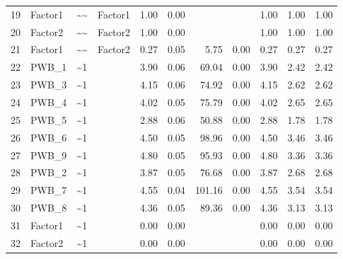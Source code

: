 \documentclass{article}
\begin{document}
\begin{table}[ht]
\begin{tabular}{rlllrrrrrrr}
  19 & Factor1 & \~{}\~{} & Factor1 & 1.00 & 0.00 &  &  & 1.00 & 1.00 & 1.00 \\ 
  20 & Factor2 & \~{}\~{} & Factor2 & 1.00 & 0.00 &  &  & 1.00 & 1.00 & 1.00 \\ 
  21 & Factor1 & \~{}\~{} & Factor2 & 0.27 & 0.05 & 5.75 & 0.00 & 0.27 & 0.27 & 0.27 \\ 
  22 & PWB\_1 & \~{}1 &  & 3.90 & 0.06 & 69.04 & 0.00 & 3.90 & 2.42 & 2.42 \\ 
  23 & PWB\_3 & \~{}1 &  & 4.15 & 0.06 & 74.92 & 0.00 & 4.15 & 2.62 & 2.62 \\ 
  24 & PWB\_4 & \~{}1 &  & 4.02 & 0.05 & 75.79 & 0.00 & 4.02 & 2.65 & 2.65 \\ 
  25 & PWB\_5 & \~{}1 &  & 2.88 & 0.06 & 50.88 & 0.00 & 2.88 & 1.78 & 1.78 \\ 
  26 & PWB\_6 & \~{}1 &  & 4.50 & 0.05 & 98.96 & 0.00 & 4.50 & 3.46 & 3.46 \\ 
  27 & PWB\_9 & \~{}1 &  & 4.80 & 0.05 & 95.93 & 0.00 & 4.80 & 3.36 & 3.36 \\ 
  28 & PWB\_2 & \~{}1 &  & 3.87 & 0.05 & 76.68 & 0.00 & 3.87 & 2.68 & 2.68 \\ 
  29 & PWB\_7 & \~{}1 &  & 4.55 & 0.04 & 101.16 & 0.00 & 4.55 & 3.54 & 3.54 \\ 
  30 & PWB\_8 & \~{}1 &  & 4.36 & 0.05 & 89.36 & 0.00 & 4.36 & 3.13 & 3.13 \\ 
  31 & Factor1 & \~{}1 &  & 0.00 & 0.00 &  &  & 0.00 & 0.00 & 0.00 \\ 
  32 & Factor2 & \~{}1 &  & 0.00 & 0.00 &  &  & 0.00 & 0.00 & 0.00 \\ 
   \hline
\end{tabular}
\end{table}
\end{document}
